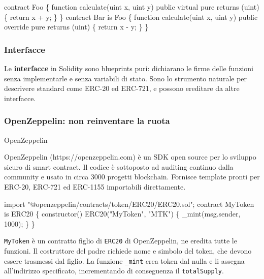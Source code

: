 \documentclass[
  italian,
  openany]{book}
\newenvironment{Shaded}{\begin{snugshade}}{\end{snugshade}}
\newcommand{\NormalTok}[1]{#1}
\begin{document}
\begin{Shaded}
\begin{Highlighting}[]
\NormalTok{contract Foo \{}
\NormalTok{    function calculate(uint x, uint y) public virtual pure returns (uint) \{}
\NormalTok{        return x + y;}
\NormalTok{    \}}
\NormalTok{\}}
\NormalTok{contract Bar is Foo \{}
\NormalTok{    function calculate(uint x, uint y) public override pure returns (uint) \{}
\NormalTok{        return x {-} y;}
\NormalTok{    \}}
\NormalTok{\}}
\end{Highlighting}
\end{Shaded}

\subsubsection{Interfacce}\label{interfacce}

Le \textbf{interfacce} in Solidity sono blueprints puri: dichiarano le
firme delle funzioni senza implementarle e senza variabili di stato.
Sono lo strumento naturale per descrivere standard come ERC-20 ed
ERC-721, e possono ereditare da altre interfacce.

\subsubsection{OpenZeppelin: non reinventare la
ruota}\label{openzeppelin-non-reinventare-la-ruota}

\begin{callouttip}{OpenZeppelin}

OpenZeppelin (https://openzeppelin.com) è un SDK open source per lo
sviluppo sicuro di smart contract. Il codice è sottoposto ad auditing
continuo dalla community e usato in circa 3000 progetti blockchain.
Fornisce template pronti per ERC-20, ERC-721 ed ERC-1155 importabili
direttamente.

\end{callouttip}

\begin{Shaded}
\begin{Highlighting}[]
\NormalTok{import "@openzeppelin/contracts/token/ERC20/ERC20.sol";}
\NormalTok{contract MyToken is ERC20 \{}
\NormalTok{    constructor() ERC20("MyToken", "MTK") \{}
\NormalTok{        \_mint(msg.sender, 1000);}
\NormalTok{    \}}
\NormalTok{\}}
\end{Highlighting}
\end{Shaded}

\texttt{MyToken} è un contratto figlio di \texttt{ERC20} di
OpenZeppelin, ne eredita tutte le funzioni. Il costruttore del padre
richiede nome e simbolo del token, che devono essere trasmessi dal
figlio. La funzione \texttt{\_mint} crea token dal nulla e li assegna
all'indirizzo specificato, incrementando di conseguenza il
\texttt{totalSupply}.
\end{document}
